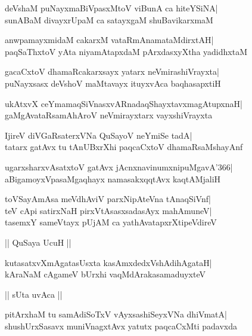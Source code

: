 \documentclass[twoside,12pt,openright]{book}
\newcounter{shloka}[chapter]
\begin{document}
\begin{shloka}%
deVshaM puNayxmaBiVpasxMtoV viBunA ca hiteYSiNA|\\
sunABaM divayxrUpaM ca satayxgaM shuBavikarxmaM
\end{shloka}

\begin{shloka}%
anwpamayxmidaM cakarxM vataRmAnamataMdirxtAH|\\
paqSaThxtoV yAta niyamAtapxdaM pArxdasxyXtha yadidhxtaM
\end{shloka}

\begin{shloka}%
gacaCxtoV dhamaRcakarxsayx yatarx neVmirashiVrayxta|\\
puNayxsasx deVshoV maMtavayx ituyxvAca baqhasapxtiH
\end{shloka}

\begin{shloka}%
ukAtxvX ceYmamaqSiVnasxvARnadaqShayxtavxmagAtupxnaH|\\
gaMgAvataRsamAhAroV neVmirayxtarx vayxshiVrayxta
\end{shloka}

\begin{shloka}%
IjireV diVGaRsaterxVNa QuSayoV neYmiSe tadA|\\
tatarx gatAvx tu tAnUBxrXhi paqcaCxtoV dhamaRsaMshayAnf
\end{shloka}

\begin{shloka}%
ugarxsharxvAsatxtoV gatAvx jAcnxnavinumxnipuMgavA\char'366|\\
aBigamoyxVpasaMgaqhayx namasakxqqtAvx kaqtAMjaliH
\end{shloka}

\begin{shloka}%
toVSayAmAsa meVdhAviV parxNipAteVna tAnaqSiVnf|\\
teV cApi satirxNaH pirxVtAsasxsadasAyx mahAmuneV|\\
tasemxY sameVtayx pUjAM ca yathAvatapxrXtipeVdireV
\end{shloka}

\begin{center}
|| QuSaya UcuH ||
\end{center}
\begin{shloka}%
kutasatxvXmAgatasUsxta kasAmxdedxVshAdihAgataH|\\
kAraNaM cAgameV bUrxhi vaqMdArakasamaduyxteV
\end{shloka}

\begin{center}
|| sUta uvAca ||
\end{center}
\begin{shloka}%
pitArxhaM tu samAdiSoTxV vAyxsashiSeyxVNa dhiVmatA|\\
shushUrxSasavx muniVnagxtAvx yatutx paqcaCxMti padavxda
\end{shloka}
\end{document}
